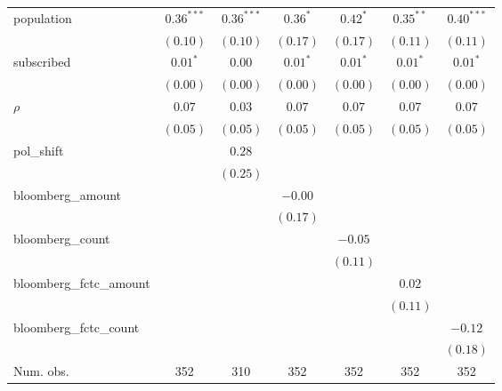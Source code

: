 \begin{table}[!h]
\begin{center}
\begin{tabular}{l c c c c c c }
population              & $0.36^{***}$ & $0.36^{***}$  & $0.36^{*}$   & $0.42^{*}$   & $0.35^{**}$  & $0.40^{***}$  \\
                        & $(0.10)$     & $(0.10)$      & $(0.17)$     & $(0.17)$     & $(0.11)$     & $(0.11)$      \\
subscribed              & $0.01^{*}$   & $0.00$        & $0.01^{*}$   & $0.01^{*}$   & $0.01^{*}$   & $0.01^{*}$    \\
                        & $(0.00)$     & $(0.00)$      & $(0.00)$     & $(0.00)$     & $(0.00)$     & $(0.00)$      \\
$\rho$                  & $0.07$       & $0.03$        & $0.07$       & $0.07$       & $0.07$       & $0.07$        \\
                        & $(0.05)$     & $(0.05)$      & $(0.05)$     & $(0.05)$     & $(0.05)$     & $(0.05)$      \\
pol\_shift              &              & $0.28$        &              &              &              &               \\
                        &              & $(0.25)$      &              &              &              &               \\
bloomberg\_amount       &              &               & $-0.00$      &              &              &               \\
                        &              &               & $(0.17)$     &              &              &               \\
bloomberg\_count        &              &               &              & $-0.05$      &              &               \\
                        &              &               &              & $(0.11)$     &              &               \\
bloomberg\_fctc\_amount &              &               &              &              & $0.02$       &               \\
                        &              &               &              &              & $(0.11)$     &               \\
bloomberg\_fctc\_count  &              &               &              &              &              & $-0.12$       \\
                        &              &               &              &              &              & $(0.18)$      \\
\midrule
Num. obs.               & 352          & 310           & 352          & 352          & 352          & 352           \\

\end{tabular}
\end{center}
\end{table}
